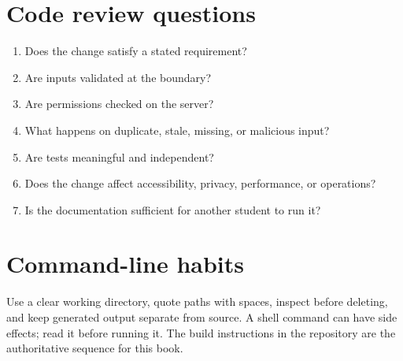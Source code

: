 \section{Code review questions}
\begin{enumerate}
\item Does the change satisfy a stated requirement?
\item Are inputs validated at the boundary?
\item Are permissions checked on the server?
\item What happens on duplicate, stale, missing, or malicious input?
\item Are tests meaningful and independent?
\item Does the change affect accessibility, privacy, performance, or operations?
\item Is the documentation sufficient for another student to run it?
\end{enumerate}

\section{Command-line habits}
Use a clear working directory, quote paths with spaces, inspect before deleting, and keep generated output separate from source. A shell command can have side effects; read it before running it. The build instructions in the repository are the authoritative sequence for this book.

